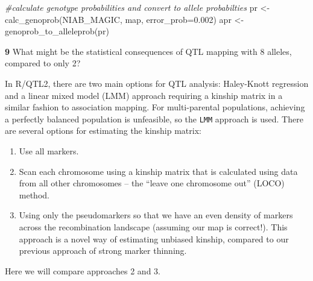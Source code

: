 \documentclass[
]{book}
\makeatletter
\newenvironment{Shaded}{\begin{snugshade}}{\end{snugshade}}
\newcommand{\AttributeTok}[1]{\textcolor[rgb]{0.77,0.63,0.00}{#1}}
\newcommand{\CommentTok}[1]{\textcolor[rgb]{0.56,0.35,0.01}{\textit{#1}}}
\newcommand{\DecValTok}[1]{\textcolor[rgb]{0.00,0.00,0.81}{#1}}
\newcommand{\FloatTok}[1]{\textcolor[rgb]{0.00,0.00,0.81}{#1}}
\newcommand{\FunctionTok}[1]{\textcolor[rgb]{0.00,0.00,0.00}{#1}}
\newcommand{\NormalTok}[1]{#1}
\newcommand{\OtherTok}[1]{\textcolor[rgb]{0.56,0.35,0.01}{#1}}
\newcommand{\SpecialCharTok}[1]{\textcolor[rgb]{0.00,0.00,0.00}{#1}}
\newcommand{\StringTok}[1]{\textcolor[rgb]{0.31,0.60,0.02}{#1}}
\newenvironment{kframe}{%
\medskip{}
\setlength{\fboxsep}{.8em}
 \def\at@end@of@kframe{}%
 \ifinner\ifhmode%
  \def\at@end@of@kframe{\end{minipage}}%
  \begin{minipage}{\columnwidth}%
 \fi\fi%
 \def\FrameCommand##1{\hskip\@totalleftmargin \hskip-\fboxsep
 \colorbox{shadecolor}{##1}\hskip-\fboxsep
     \hskip-\linewidth \hskip-\@totalleftmargin \hskip\columnwidth}%
 \MakeFramed {\advance\hsize-\width
   \@totalleftmargin\z@ \linewidth\hsize
   \@setminipage}}%
 {\par\unskip\endMakeFramed%
 \at@end@of@kframe}
\newenvironment{rmdblock}[1]
  {
  \begin{itemize}
  \renewcommand{\labelitemi}{
    \raisebox{-.7\height}[0pt][0pt]{
      {\setkeys{Gin}{width=3em,keepaspectratio}\texttt{[image: images/\#1]}}
    }
  }
  \setlength{\fboxsep}{1em}
  \begin{kframe}
  \item
  }
  {
  \end{kframe}
  \end{itemize}
  }
\newenvironment{rmdquiz}
  {\begin{rmdblock}{quiz}}
  {\end{rmdblock}}
\makeatother
\begin{document}
\begin{Shaded}
\begin{Highlighting}[]
\CommentTok{\#calculate genotype probabilities and convert to allele probabilties }
\NormalTok{pr }\OtherTok{\textless{}{-}} \FunctionTok{calc\_genoprob}\NormalTok{(NIAB\_MAGIC, map, }\AttributeTok{error\_prob=}\FloatTok{0.002}\NormalTok{)}
\NormalTok{apr }\OtherTok{\textless{}{-}} \FunctionTok{genoprob\_to\_alleleprob}\NormalTok{(pr)}
\end{Highlighting}
\end{Shaded}

\begin{rmdquiz}
\textbf{9}
What might be the statistical consequences of QTL mapping with 8 alleles, compared to only 2?
\end{rmdquiz}

In R/QTL2, there are two main options for QTL analysis: Haley-Knott regression and a linear mixed model (LMM) approach requiring a kinship matrix in a similar fashion to association mapping. For multi-parental populations, achieving a perfectly balanced population is unfeasible, so the \texttt{LMM} approach is used. There are several options for estimating the kinship matrix:

\begin{enumerate}
\def\labelenumi{\arabic{enumi}.}
\item
  Use all markers.
\item
  Scan each chromosome using a kinship matrix that is calculated using data from all other chromosomes -- the ``leave one chromosome out'' (LOCO) method.
\item
  Using only the pseudomarkers so that we have an even density of markers across the recombination landscape (assuming our map is correct!). This approach is a novel way of estimating unbiased kinship, compared to our previous approach of strong marker thinning.
\end{enumerate}

Here we will compare approaches 2 and 3.

\begin{Shaded}
\end{Shaded}
\end{document}
